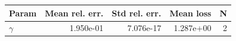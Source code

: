 \begin{tabular}{lrrrr}
\hline
Param & Mean rel. err. & Std rel. err. & Mean loss & N \\
\hline
$\gamma$ & 1.950e-01 & 7.076e-17 & 1.287e+00 & 2 \\
\hline
\end{tabular}
